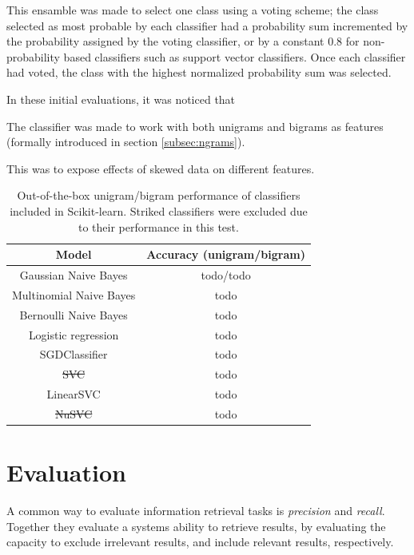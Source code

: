 \documentclass[a4paper,11pt]{kth-mag}
\begin{document}
This ensamble was made to select one class using a voting scheme;
the class selected as most probable by each classifier had a probability sum incremented
by the probability assigned by the voting classifier, or by a constant 0.8 for non-probability based classifiers such as support vector classifiers. Once each classifier had voted, the class with the highest normalized probability sum was selected.

In these initial evaluations, it was noticed that 

The classifier was made to work with both unigrams and bigrams as features (formally introduced in section \ref{subsec:ngrams}).



This was to expose effects of skewed data on different features.

\begin{table}[h]
  \centering
  \begin{tabular}{| c | c |}
    \hline
    \textbf{Model} & \textbf{Accuracy (unigram/bigram)}\\ \hline
    Gaussian Naive Bayes & todo/todo \\
    Multinomial Naive Bayes & todo \\
    Bernoulli Naive Bayes & todo \\
    Logistic regression & todo \\
    SGDClassifier & todo \\
    \sout{SVC} & todo \\
    LinearSVC  & todo \\
    \sout{NuSVC} & todo \\
    \hline
  \end{tabular}
  \caption{Out-of-the-box unigram/bigram performance of classifiers included in Scikit-learn. Striked classifiers were excluded due to their performance in this test.}
  \label{tab:individual_classifier_accuracy}
\end{table}




\section{Evaluation}
\label{sec:precision_recall}
A common way to evaluate information retrieval tasks is \emph{precision}
and \emph{recall}. Together they evaluate a systems ability to retrieve results,
by evaluating the capacity to exclude irrelevant results,
and include relevant results, respectively.
\end{document}
